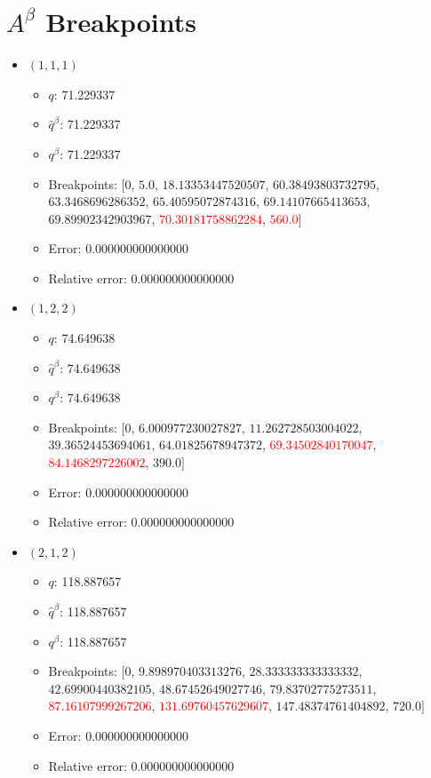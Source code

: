 \documentclass{article}%
\begin{document}
\section{$A^\beta$ Breakpoints}%
\thispagestyle{plain}%
\begin{itemize}%
	\item $(1, 1, 1)$%
	\begin{itemize}%
		\item $q$: 71.229337%
		\item $\hat{q}^\beta$: 71.229337%
		\item $q^\beta$: 71.229337%
		\item Breakpoints: $[$$0$, $5.0$, $18.13353447520507$, $60.38493803732795$, $63.3468696286352$, $65.40595072874316$, $69.14107665413653$, $69.89902342903967$, \textcolor{red}{$70.30181758862284$}, \textcolor{red}{$560.0$}$]$%
		\item Error: 0.000000000000000%
		\item Relative error: 0.000000000000000%
	\end{itemize}%
	\item $(1, 2, 2)$%
	\begin{itemize}%
		\item $q$: 74.649638%
		\item $\hat{q}^\beta$: 74.649638%
		\item $q^\beta$: 74.649638%
		\item Breakpoints: $[$$0$, $6.000977230027827$, $11.262728503004022$, $39.36524453694061$, $64.01825678947372$, \textcolor{red}{$69.34502840170047$}, \textcolor{red}{$84.1468297226002$}, $390.0$$]$%
		\item Error: 0.000000000000000%
		\item Relative error: 0.000000000000000%
	\end{itemize}%
	\item $(2, 1, 2)$%
	\begin{itemize}%
		\item $q$: 118.887657%
		\item $\hat{q}^\beta$: 118.887657%
		\item $q^\beta$: 118.887657%
		\item Breakpoints: $[$$0$, $9.898970403313276$, $28.333333333333332$, $42.69900440382105$, $48.67452649027746$, $79.83702775273511$, \textcolor{red}{$87.16107999267206$}, \textcolor{red}{$131.69760457629607$}, $147.48374761404892$, $720.0$$]$%
		\item Error: 0.000000000000000%
		\item Relative error: 0.000000000000000%

\end{itemize}
\end{itemize}
\end{document}
